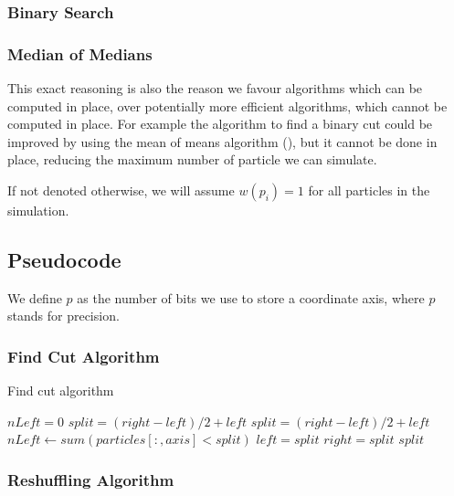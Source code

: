 \documentclass[]{article}
\begin{document}
\subsubsection{Binary Search}

\subsubsection{Median of Medians}
This exact reasoning is also the reason we favour algorithms which can be computed in place, over potentially more efficient algorithms, which cannot be computed in place. For example the algorithm to find a binary cut could be improved by using the mean of means algorithm (), but it cannot be done in place, reducing the maximum number of particle we can simulate. 

If not denoted otherwise, we will assume $w(p_i) = 1$ for all particles in the simulation.

\subsection{Pseudocode}

We define $p$ as the number of bits we use to store a coordinate axis, where $p$ stands for precision.


\subsubsection{Find Cut Algorithm}
	

\begin{algorithm}[H]
	\caption{Find cut algorithm}\label{euclid}
	\begin{algorithmic}[1]
		\State $nLeft = 0$
		\State $split = (right - left) / 2 + left $ 
		\State $split = (right - left) / 2 + left $
		\State $nLeft\gets sum(particles[:,axis] < split)$
		\State $left = split$
		\Else 
		\State $right = split$
		\EndIf
		\EndWhile\label{euclidendwhile}
		\State \Return $split$
		\EndProcedure
	\end{algorithmic}
\end{algorithm}

\subsubsection{Reshuffling Algorithm}
\end{document}
